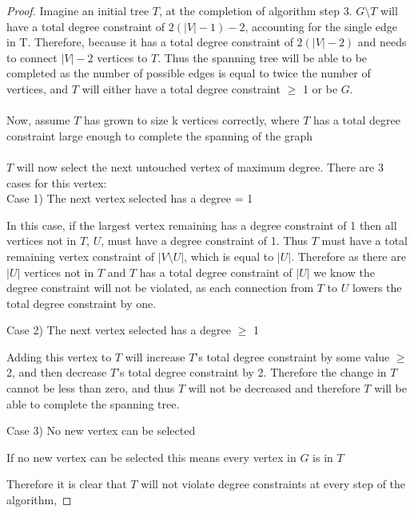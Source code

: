 \documentclass{article}
\begin{document}
\begin{proof}
Imagine an initial tree $T$, at the completion of algorithm step 3. $G \setminus T$ will have a total degree constraint of $2(|V|-1)-2$, accounting for the single edge in T. Therefore, because it has a total degree constraint of $2(|V|-2)$ and needs to connect $|V|-2$ vertices to $T$. Thus the spanning tree will be able to be completed as the number of possible edges is equal to twice the number of vertices, and $T$ will either have a total degree constraint $\geq$ 1 or be $G$. 
\\
\\
Now, assume $T$ has grown to size k vertices correctly, where $T$ has a total degree constraint large enough to complete the spanning of the graph
\\\\
$T$ will now select the next untouched vertex of maximum degree. There are 3 cases for this vertex:
\\

    \setlength\parindent{12pt} 
    Case 1) The next vertex selected has a degree = 1 \par
        \setlength\parindent{24pt}\hangindent=24pt 
        In this case, if the largest vertex remaining has a degree constraint of 1 then all vertices not in $T$, $U$, must
        have a degree constraint of 1. Thus $T$ must have a total remaining vertex constraint of $|V \setminus U|$, which is equal to  $|U|$. Therefore as there are $|U|$ vertices not in $T$ and $T$ has a total degree constraint of $|U|$ we know the degree constraint will not be violated, as each connection from $T$ to $U$ lowers the total degree constraint by one.
        \par
        
    \setlength\parindent{12pt}
    Case 2) The next vertex selected has a degree $\geq$ 1\par
        \setlength\parindent{24pt}\hangindent=24pt 
        Adding this vertex to $T$ will increase $T$'s total degree constraint by some value $\geq$ 2, and then decrease $T$'s total degree constraint by 2.
        Therefore the change in $T$ cannot be less than zero, and thus $T$ will not be decreased and therefore $T$ will be able to complete the spanning tree.
        \par

    \setlength\parindent{12pt}
    Case 3) No new vertex can be selected\par
        \setlength\parindent{24pt}\hangindent=24pt 
        If no new vertex can be selected this means every vertex in $G$ is in $T$
        \par
        
    \setlength\parindent{0pt}\hangindent=0pt
    Therefore it is clear that $T$ will not violate degree constraints at every step of the algorithm,

\end{proof}
\end{document}
